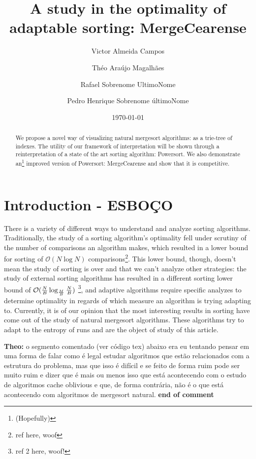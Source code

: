 \documentclass[a4paper]{article}
\title{\textbf{A study in the optimality of adaptable sorting: MergeCearense}}
\author{Victor Almeida Campos \and Théo Araújo Magalhães \and Rafael Sobrenome UltimoNome \and Pedro Henrique Sobrenome últimoNome}
\date{
	\today
}
\theoremstyle{plain}
\theoremstyle{definition}
\begin{document}
\maketitle

\begin{abstract}
We propose a novel way of visualizing natural mergesort algorithms: as a trie-tree of 
indexes. The utility of our framework of interpretation will be shown through a reinterpretation of
a state of the art sorting algorithm: Powersort. We also demonstrate an\footnote{(Hopefully)}
improved version of Powersort: MergeCearense and show that it is competitive.
\end{abstract}

\section{Introduction - ESBOÇO}
There is a variety of different ways to understand and analyze sorting algorithms. Traditionally, the
study of a sorting algorithm's optimality fell under scrutiny of the number of comparisons an algorithm makes, which 
resulted in a lower bound for sorting of $\mathcal{O}(N \log N)$ comparisons\footnote{ref here, woof}. 
This lower bound, though, doesn't mean the study of sorting is over and that we can't  analyze other strategies: the study 
of external sorting algorithms has resulted in a different sorting lower bound of $\mathcal{O}({N \over B} \log_{M \over B} {N \over B})$ \footnote{ref 2 here, woof!},
and adaptive algorithms require specific analyzes to determine optimality in regards of which measure an algorithm is 
trying adapting to. Currently, it is of our opinion that the most interesting results in sorting have come out of 
the study of natural mergesort algorithms. These algorithms try to adapt to the entropy of runs and are the object of study
of this article. 

\noindent\textbf{Theo:} o segmento comentado (ver código tex) abaixo era eu tentando pensar em uma forma de falar como
é legal estudar algoritmos que estão relacionados com a estrutura do problema,
mas que isso é difícil e se feito de forma ruim pode ser muito ruim e 
dizer que é mais ou menos isso que está acontecendo com o estudo de algoritmos cache oblivious
e que, de forma contrária, não é o que está acontecendo com algoritmos de mergesort natural. 
\newline \noindent \textbf{end of comment}

\end{document}
